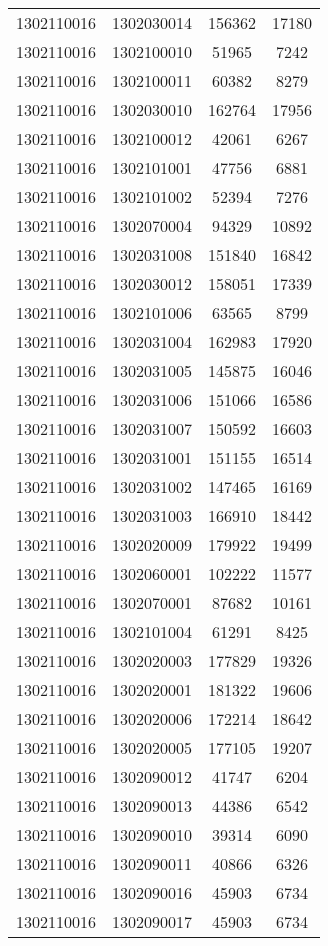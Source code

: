 \begin{longtable}{llcc}
1302110016 & 1302030014 & 156362 & 17180\\
1302110016 & 1302100010 & 51965 & 7242\\
1302110016 & 1302100011 & 60382 & 8279\\
1302110016 & 1302030010 & 162764 & 17956\\
1302110016 & 1302100012 & 42061 & 6267\\
1302110016 & 1302101001 & 47756 & 6881\\
1302110016 & 1302101002 & 52394 & 7276\\
1302110016 & 1302070004 & 94329 & 10892\\
1302110016 & 1302031008 & 151840 & 16842\\
1302110016 & 1302030012 & 158051 & 17339\\
1302110016 & 1302101006 & 63565 & 8799\\
1302110016 & 1302031004 & 162983 & 17920\\
1302110016 & 1302031005 & 145875 & 16046\\
1302110016 & 1302031006 & 151066 & 16586\\
1302110016 & 1302031007 & 150592 & 16603\\
1302110016 & 1302031001 & 151155 & 16514\\
1302110016 & 1302031002 & 147465 & 16169\\
1302110016 & 1302031003 & 166910 & 18442\\
1302110016 & 1302020009 & 179922 & 19499\\
1302110016 & 1302060001 & 102222 & 11577\\
1302110016 & 1302070001 & 87682 & 10161\\
1302110016 & 1302101004 & 61291 & 8425\\
1302110016 & 1302020003 & 177829 & 19326\\
1302110016 & 1302020001 & 181322 & 19606\\
1302110016 & 1302020006 & 172214 & 18642\\
1302110016 & 1302020005 & 177105 & 19207\\
1302110016 & 1302090012 & 41747 & 6204\\
1302110016 & 1302090013 & 44386 & 6542\\
1302110016 & 1302090010 & 39314 & 6090\\
1302110016 & 1302090011 & 40866 & 6326\\
1302110016 & 1302090016 & 45903 & 6734\\
1302110016 & 1302090017 & 45903 & 6734\\

\end{longtable}
